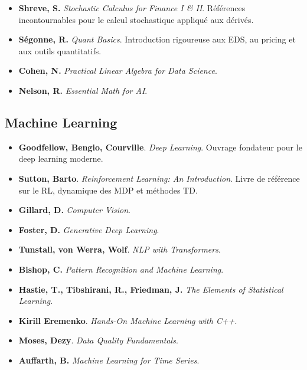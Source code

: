 \documentclass[11pt,a4paper]{article}
\newcommand{\1}{\mathbf{1}}
\begin{document}
\begin{itemize}
  \item \textbf{Shreve, S.}
        \emph{Stochastic Calculus for Finance I \& II}.
        Références incontournables pour le calcul stochastique appliqué aux dérivés.

  \item \textbf{Ségonne, R.}
        \emph{Quant Basics}.
        Introduction rigoureuse aux EDS, au pricing et aux outils quantitatifs.

  \item \textbf{Cohen, N.}
        \emph{Practical Linear Algebra for Data Science}.

  \item \textbf{Nelson, R.}
        \emph{Essential Math for AI}.
\end{itemize}

\subsection{Machine Learning}

\begin{itemize}
  \item \textbf{Goodfellow, Bengio, Courville}.
        \emph{Deep Learning}.
        Ouvrage fondateur pour le deep learning moderne.

  \item \textbf{Sutton, Barto}.
        \emph{Reinforcement Learning: An Introduction}.
        Livre de référence sur le RL, dynamique des MDP et méthodes TD.

  \item \textbf{Gillard, D.}
        \emph{Computer Vision}.

  \item \textbf{Foster, D.}
        \emph{Generative Deep Learning}.

  \item \textbf{Tunstall, von Werra, Wolf}.
        \emph{NLP with Transformers}.

  \item \textbf{Bishop, C.}
        \emph{Pattern Recognition and Machine Learning}.

  \item \textbf{Hastie, T., Tibshirani, R., Friedman, J.}
        \emph{The Elements of Statistical Learning}.

  \item \textbf{Kirill Eremenko}.
        \emph{Hands-On Machine Learning with C++}.

  \item \textbf{Moses, Dezy}.
        \emph{Data Quality Fundamentals}.

  \item \textbf{Auffarth, B.}
        \emph{Machine Learning for Time Series}.
\end{itemize}
\end{document}
